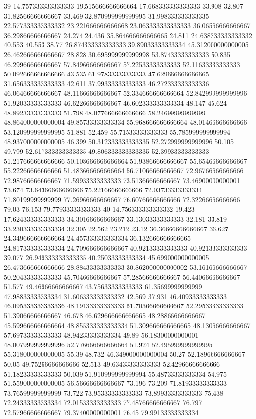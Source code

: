 39 14.757333333333333 19.515666666666664 17.668333333333333 33.908 32.807 31.82566666666667 33.469 32.870999999999995 31.998333333333335 22.577333333333332 23.221666666666668 23.063333333333333 36.06566666666667 36.29866666666667 24.274 24.436 35.864666666666665 24.811 24.638333333333332 40.553 40.553 38.77 26.874333333333333 39.89033333333334 45.312000000000005 26.462666666666667 28.828 30.695999999999998 53.87433333333333 50.835 46.29966666666667 57.84966666666667 57.22533333333333 52.11633333333333 50.092666666666666 43.535 61.97833333333333 47.629666666666665 31.656333333333333 42.611 37.99333333333333 46.272333333333336 46.06466666666667 48.11666666666667 52.334666666666664 52.842999999999996 51.92033333333333 46.62266666666667 46.602333333333334 48.147 45.624 48.89233333333333 51.798 48.077666666666666 58.24699999999999 48.864000000000004 49.85733333333334 55.968666666666664 48.01466666666666 53.120999999999995 51.881 52.459 55.71533333333333 55.785999999999994 48.937000000000005 46.399 50.312333333333335 52.272999999999996 50.105 49.799 52.617333333333335 49.806333333333335 52.39933333333333 51.217666666666666 50.108666666666664 51.93866666666667 55.65466666666667 55.22266666666666 51.483666666666664 56.71066666666667 72.96766666666666 72.98766666666667 71.59933333333333 73.51366666666667 73.46900000000001 73.674 73.64366666666666 75.22166666666666 72.03733333333334 71.80199999999999 77.26966666666667 76.60766666666666 72.32266666666666 79.03 76.153 79.77933333333333
40 14.756333333333332 19.423 17.624333333333333 34.30166666666667 33.13033333333333 32.181 33.819 33.230333333333334 32.305 22.562 23.212 23.12 36.36666666666667 36.627 24.349666666666664 24.457333333333334 36.132666666666665 24.817333333333334 24.709666666666667 40.92133333333333 40.92133333333333 39.077 26.949333333333335 40.25033333333334 45.699000000000005 26.473666666666666 28.88433333333333 30.862000000000002 53.16166666666667 50.20433333333333 45.70466666666667 57.28566666666667 56.44066666666667 51.577 49.46966666666667 43.75633333333333 61.35699999999999 47.98833333333334 31.606333333333332 42.569 37.931 46.40933333333333 46.095333333333336 48.19133333333333 51.70366666666667 52.29533333333333 51.39066666666667 46.678 46.629666666666665 48.28866666666667 45.599666666666664 48.855333333333334 51.309666666666665 48.13066666666667 57.69733333333333 48.94233333333334 49.89 56.18300000000001 48.007999999999996 52.776666666666664 51.924 52.495999999999995 55.318000000000005 55.39 48.732 46.349000000000004 50.27 52.18966666666667 50.05 49.75266666666666 52.513 49.63433333333333 52.42966666666666 51.18233333333333 50.039 51.910999999999994 55.48733333333334 54.975 51.559000000000005 56.56666666666667 73.196 73.209 71.81933333333333 73.76599999999999 73.722 73.95333333333333 73.89933333333333 75.438 72.24333333333334 72.01533333333333 77.48766666666667 76.797 72.57966666666667 79.37400000000001 76.45 79.99133333333334
